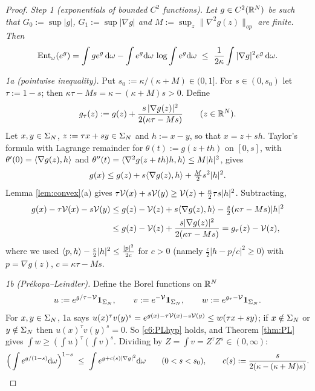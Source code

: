 \begin{proof}
\emph{Step 1 (exponentials of bounded $C^2$ functions).} \emph{Let $g\in C^2(\mathbb{R}^N)$ be such that
$G_0:=\sup|g|$, $G_1:=\sup|\nabla g|$ and $M:=\sup_{z}\|\nabla^2g(z)\|_{op}$ are finite. Then}
\begin{equation}\label{c6:LSIexp}
\operatorname{Ent}_\omega(e^g)=\int ge^g\,\mathrm{d}\omega-\int e^g\mathrm{d}\omega\,\log\int e^g\mathrm{d}\omega\ \le\ \frac1{2\kappa}\int|\nabla g|^2e^g\,\mathrm{d}\omega .
\end{equation}

\emph{1a (pointwise inequality).} Put $s_0:=\kappa/(\kappa+M)\in(0,1]$. For $s\in(0,s_0)$ let $\tau:=1-s$; then $\kappa\tau-Ms=\kappa-(\kappa+M)s>0$. Define
\[g_\tau(z):=g(z)+\frac{s\,|\nabla g(z)|^2}{2(\kappa\tau-Ms)}\qquad(z\in\mathbb{R}^N).\]
Let $x,y\in\Sigma_N$, $z:=\tau x+sy\in\Sigma_N$ and $h:=x-y$, so that $x=z+sh$.
Taylor's formula with Lagrange remainder for $\theta(t):=g(z+th)$ on $[0,s]$, with $\theta'(0)=\langle\nabla g(z),h\rangle$ and $\theta''(t)=\langle\nabla^2g(z+th)h,h\rangle\le M|h|^2$, gives
\[g(x)\le g(z)+s\langle\nabla g(z),h\rangle+\tfrac M2s^2|h|^2 .\]
Lemma \ref{lem:convex}(a) gives $\tau\mathcal{V}(x)+s\mathcal{V}(y)\ge\mathcal{V}(z)+\frac\kappa2\tau s|h|^2$. Subtracting,
\begin{align*}
g(x)-\tau\mathcal{V}(x)-s\mathcal{V}(y)&\le g(z)-\mathcal{V}(z)+s\langle\nabla g(z),h\rangle-\tfrac s2(\kappa\tau-Ms)|h|^2\\
&\le g(z)-\mathcal{V}(z)+\frac{s|\nabla g(z)|^2}{2(\kappa\tau-Ms)}=g_\tau(z)-\mathcal{V}(z),
\end{align*}
where we used $\langle p,h\rangle-\frac c2|h|^2\le\frac{|p|^2}{2c}$ for $c>0$ (namely $\frac c2|h-p/c|^2\ge0$) with $p=\nabla g(z)$, $c=\kappa\tau-Ms$.

\emph{1b (Pr\'ekopa--Leindler).} Define the Borel functions on $\mathbb{R}^N$
\[u:=e^{g/\tau-\mathcal{V}}\mathbf 1_{\Sigma_N},\qquad v:=e^{-\mathcal{V}}\mathbf 1_{\Sigma_N},\qquad w:=e^{g_\tau-\mathcal{V}}\mathbf 1_{\Sigma_N}.\]
For $x,y\in\Sigma_N$, 1a says $u(x)^\tau v(y)^{s}=e^{g(x)-\tau\mathcal{V}(x)-s\mathcal{V}(y)}\le w(\tau x+sy)$; if $x\notin\Sigma_N$ or $y\notin\Sigma_N$ then $u(x)^\tau v(y)^s=0$. So \eqref{c6:PLhyp} holds, and Theorem \ref{thm:PL} gives $\int w\ge(\int u)^\tau(\int v)^s$. Dividing by $Z=\int v=Z^\tau Z^s\in(0,\infty)$:
\begin{equation}\label{c6:BLstep}
\Big(\int e^{g/(1-s)}\mathrm{d}\omega\Big)^{1-s}\ \le\ \int e^{g+c(s)|\nabla g|^2}\mathrm{d}\omega\qquad(0<s<s_0),\qquad c(s):=\frac{s}{2(\kappa-(\kappa+M)s)} .
\end{equation}


\end{proof}
